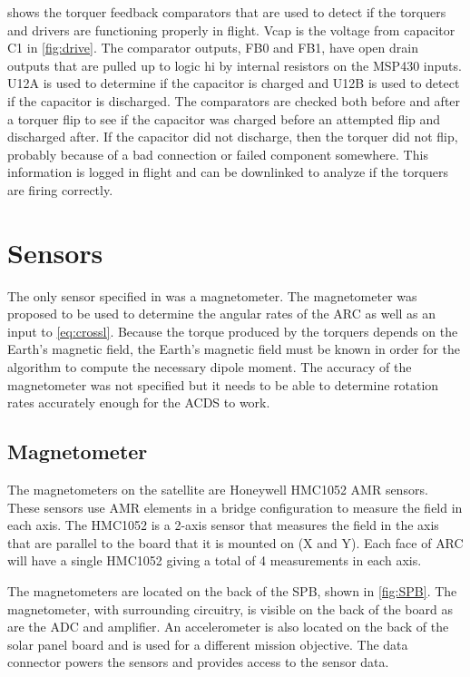  shows the torquer feedback comparators that are used to detect if the torquers and drivers are functioning properly in flight. Vcap is the voltage from capacitor C1 in \cref{fig:drive}. The comparator outputs, FB0 and FB1, have open drain outputs that are pulled up to logic hi by internal resistors on the MSP430 inputs. U12A  is used to determine if the capacitor is charged and U12B is used to detect if the capacitor is discharged. The comparators are checked both before and after a torquer flip to see if the capacitor was charged before an attempted flip and discharged after. If the capacitor did not discharge, then the torquer did not flip, probably because of a bad connection or failed component somewhere. This information is logged in flight and can be downlinked to analyze if the torquers are firing correctly.

\section{Sensors}

The only sensor specified in \cite{Mentch11} was a magnetometer. The magnetometer was proposed to be used to determine the angular rates of the \ac{ARC} as well as an input to \cref{eq:crossl}. Because the torque produced by the torquers depends on the Earth's magnetic field, the Earth's magnetic field must be known in order for the algorithm to compute the necessary dipole moment. The accuracy of the magnetometer was not specified but it needs to be able to determine rotation rates accurately enough for the \ac{ACDS} to work.

\subsection{Magnetometer}

The magnetometers on the satellite are Honeywell HMC1052 \ac{AMR} sensors. These sensors use \ac{AMR} elements in a bridge configuration to measure the field in each axis. The HMC1052 is a 2-axis sensor that measures the field in the axis that are parallel to the board that it is mounted on (X and Y). Each face of \ac{ARC} will have a single HMC1052 giving a total of 4 measurements in each axis.

The magnetometers are located on the back of the \acs{SPB}, shown in \cref{fig:SPB}. The magnetometer, with surrounding circuitry, is visible on the back of the board as are the \ac{ADC} and amplifier. An accelerometer is also located on the back of the solar panel board and is used for a different mission objective. The data connector powers the sensors and provides access to the sensor data.


